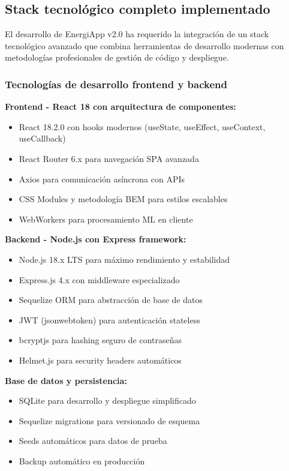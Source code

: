 \subsection{Stack tecnológico completo implementado}

El desarrollo de EnergiApp v2.0 ha requerido la integración de un stack tecnológico avanzado que combina herramientas de desarrollo modernas con metodologías profesionales de gestión de código y despliegue.

\subsubsection{Tecnologías de desarrollo frontend y backend}

\textbf{Frontend - React 18 con arquitectura de componentes:}
\begin{itemize}
    \item React 18.2.0 con hooks modernos (useState, useEffect, useContext, useCallback)
    \item React Router 6.x para navegación SPA avanzada
    \item Axios para comunicación asíncrona con APIs
    \item CSS Modules y metodología BEM para estilos escalables
    \item WebWorkers para procesamiento ML en cliente
\end{itemize}

\textbf{Backend - Node.js con Express framework:}
\begin{itemize}
    \item Node.js 18.x LTS para máximo rendimiento y estabilidad
    \item Express.js 4.x con middleware especializado
    \item Sequelize ORM para abstracción de base de datos
    \item JWT (jsonwebtoken) para autenticación stateless
    \item bcryptjs para hashing seguro de contraseñas
    \item Helmet.js para security headers automáticos
\end{itemize}

\textbf{Base de datos y persistencia:}
\begin{itemize}
    \item SQLite para desarrollo y despliegue simplificado
    \item Sequelize migrations para versionado de esquema
    \item Seeds automáticos para datos de prueba
    \item Backup automático en producción
\end{itemize}

